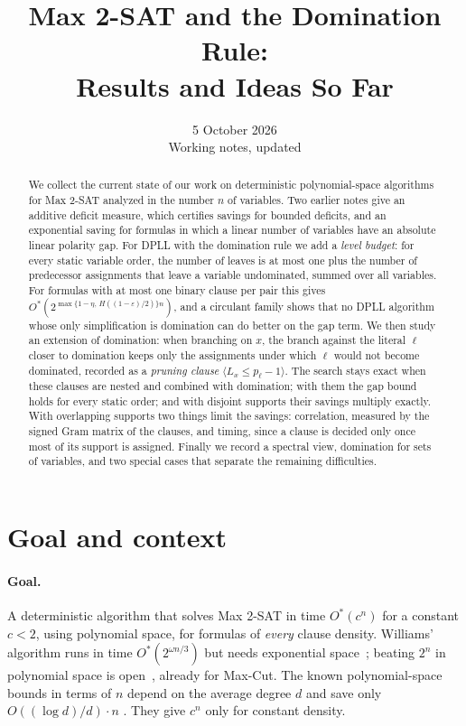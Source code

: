 \documentclass[11pt,a4paper]{article}
\title{Max 2-SAT and the Domination Rule:\\ Results and Ideas So Far}
\author{}
\date{5 October 2026\\[3pt]\small Working notes, updated}
\theoremstyle{remark}
\newcommand{\Ostar}{O^{*}}
\begin{document}
\maketitle

\begin{abstract}
We collect the current state of our work on deterministic polynomial-space
algorithms for Max 2-SAT analyzed in the number $n$ of variables. Two earlier
notes give an additive deficit measure, which certifies savings for bounded
deficits, and an exponential saving for formulas in which a linear number of
variables have an absolute linear polarity gap. For DPLL with the domination
rule we add a \emph{level budget}: for every static variable order, the number
of leaves is at most one plus the number of predecessor assignments that leave
a variable undominated, summed over all variables. For formulas with at most
one binary clause per pair this gives
$\Ostar(2^{\max\{1-\eta,\,H((1-\varepsilon)/2)\}n})$, and a circulant family
shows that no DPLL algorithm whose only simplification is domination can do
better on the gap term. We then study an extension of domination: when
branching on $x$, the branch against the literal $\ell$ closer to domination
keeps only the assignments under which $\ell$ would not become dominated,
recorded as a \emph{pruning clause} $\langle L_x\le p_\ell-1\rangle$. The search
stays exact when these clauses are nested and combined with domination; with
them the gap bound holds for every static order; and with disjoint supports
their savings multiply exactly. With overlapping supports two things limit the
savings: correlation, measured by the signed Gram matrix of the clauses, and
timing, since a clause is decided only once most of its support is assigned.
Finally we record a spectral view, domination for sets of variables, and two
special cases that separate the remaining difficulties.
\end{abstract}

\section{Goal and context}

\paragraph{Goal.} A deterministic algorithm that solves Max 2-SAT in time
$\Ostar(c^n)$ for a constant $c<2$, using polynomial space, for formulas of
\emph{every} clause density. Williams' algorithm runs in time
$\Ostar(2^{\omega n/3})$ but needs exponential space~\cite{Wil05}; beating
$2^n$ in polynomial space is open~\cite{Wil05,Woe08}, already for Max-Cut.
The known polynomial-space bounds in terms of $n$ depend on the average
degree $d$ and save only $O((\log d)/d)\cdot n$
\cite{Gol11,GK14,Has16}. They give $c^n$ only for constant density.
\end{document}
